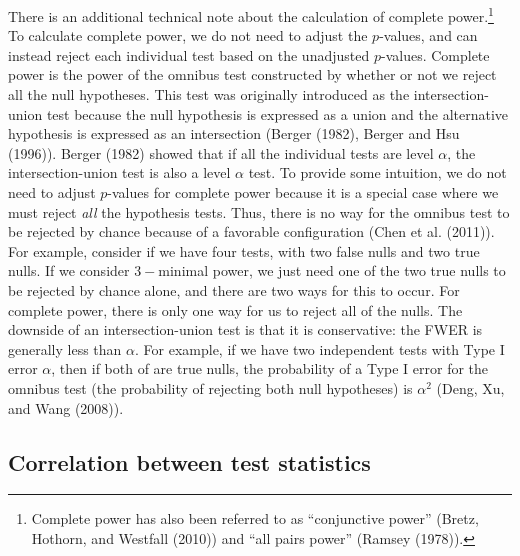 \documentclass{article}
\begin{document}
There is an additional technical note about the calculation of complete
power.\footnote{Complete power has also been referred to as
  ``conjunctive power'' (Bretz, Hothorn, and Westfall (2010)) and ``all
  pairs power'' (Ramsey (1978)).} To calculate complete power, we do not
need to adjust the \(p\)-values, and can instead reject each individual
test based on the unadjusted \(p\)-values. Complete power is the power
of the omnibus test constructed by whether or not we reject all the null
hypotheses. This test was originally introduced as the
intersection-union test because the null hypothesis is expressed as a
union and the alternative hypothesis is expressed as an intersection
(Berger (1982), Berger and Hsu (1996)). Berger (1982) showed that if all
the individual tests are level \(\alpha\), the intersection-union test
is also a level \(\alpha\) test. To provide some intuition, we do not
need to adjust \(p\)-values for complete power because it is a special
case where we must reject \emph{all} the hypothesis tests. Thus, there
is no way for the omnibus test to be rejected by chance because of a
favorable configuration (Chen et al. (2011)). For example, consider if
we have four tests, with two false nulls and two true nulls. If we
consider \(3-\)minimal power, we just need one of the two true nulls to
be rejected by chance alone, and there are two ways for this to occur.
For complete power, there is only one way for us to reject all of the
nulls. The downside of an intersection-union test is that it is
conservative: the FWER is generally less than \(\alpha\). For example,
if we have two independent tests with Type I error \(\alpha\), then if
both of are true nulls, the probability of a Type I error for the
omnibus test (the probability of rejecting both null hypotheses) is
\(\alpha^2\) (Deng, Xu, and Wang (2008)).

\subsection{Correlation between test statistics}
\label{sec:corr}
\end{document}
